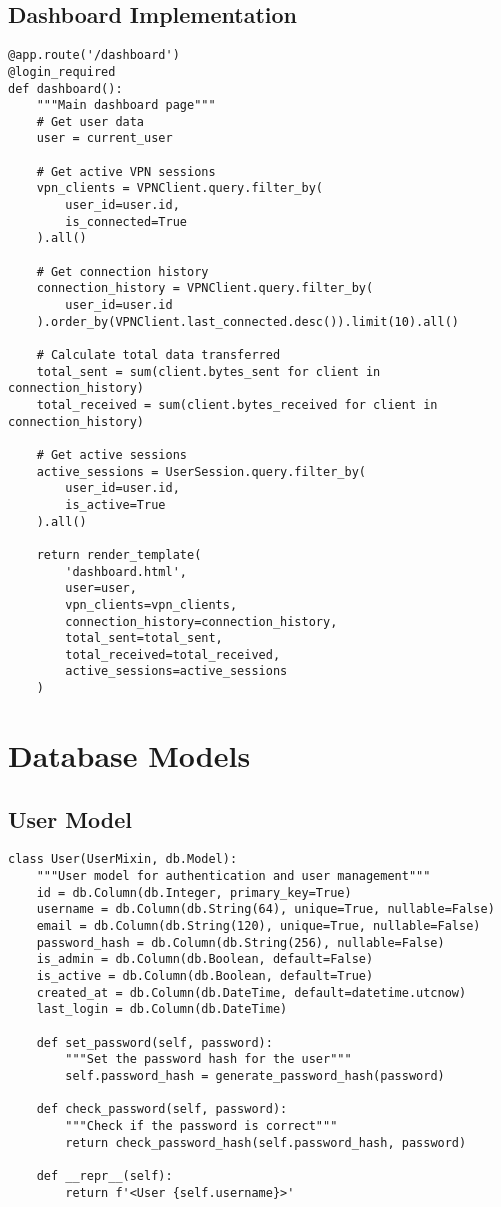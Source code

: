 \documentclass[12pt,a4paper]{report}
\begin{document}
\subsection{Dashboard Implementation}
\begin{lstlisting}[style=python, caption=Dashboard Implementation]
@app.route('/dashboard')
@login_required
def dashboard():
    """Main dashboard page"""
    # Get user data
    user = current_user
    
    # Get active VPN sessions
    vpn_clients = VPNClient.query.filter_by(
        user_id=user.id, 
        is_connected=True
    ).all()
    
    # Get connection history
    connection_history = VPNClient.query.filter_by(
        user_id=user.id
    ).order_by(VPNClient.last_connected.desc()).limit(10).all()
    
    # Calculate total data transferred
    total_sent = sum(client.bytes_sent for client in connection_history)
    total_received = sum(client.bytes_received for client in connection_history)
    
    # Get active sessions
    active_sessions = UserSession.query.filter_by(
        user_id=user.id,
        is_active=True
    ).all()
    
    return render_template(
        'dashboard.html',
        user=user,
        vpn_clients=vpn_clients,
        connection_history=connection_history,
        total_sent=total_sent,
        total_received=total_received,
        active_sessions=active_sessions
    )
\end{lstlisting}

\section{Database Models}
\subsection{User Model}
\begin{lstlisting}[style=python, caption=User Model Implementation]
class User(UserMixin, db.Model):
    """User model for authentication and user management"""
    id = db.Column(db.Integer, primary_key=True)
    username = db.Column(db.String(64), unique=True, nullable=False)
    email = db.Column(db.String(120), unique=True, nullable=False)
    password_hash = db.Column(db.String(256), nullable=False)
    is_admin = db.Column(db.Boolean, default=False)
    is_active = db.Column(db.Boolean, default=True)
    created_at = db.Column(db.DateTime, default=datetime.utcnow)
    last_login = db.Column(db.DateTime)
    
    def set_password(self, password):
        """Set the password hash for the user"""
        self.password_hash = generate_password_hash(password)
        
    def check_password(self, password):
        """Check if the password is correct"""
        return check_password_hash(self.password_hash, password)
        
    def __repr__(self):
        return f'<User {self.username}>'
\end{lstlisting}
\end{document}
